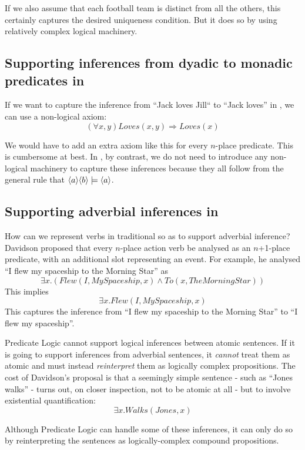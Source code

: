 \NI If we also assume that each football team is distinct from all the
others, this certainly captures the desired uniqueness condition.  But
it does so by using relatively complex logical machinery.

\subsection{Supporting inferences from dyadic to monadic predicates in \fol}
If we want to capture the inference from ``Jack loves Jill`` to ``Jack
loves'' in \fol{}, we can use a non-logical axiom:
\[
(\forall x, y) Loves(x,y) \Rightarrow Loves(x)
\]

\NI We would have to add an extra  axiom like this for every
$n$-place predicate.  This is cumbersome at best.  In \cathoristic{}, by
contrast, we do not need to introduce any non-logical machinery 
to capture these inferences because they all follow from the general
rule that $\MAY{a} \MAY{b} \models \MAY{a}$.

\subsection{Supporting adverbial inferences in \fol{}}

\NI How can we represent verbs in traditional \fol{} so as to
support adverbial inference?  Davidson \cite{davidson2} proposed that
every $n$-place action verb be analysed as an $n$+1-place predicate,
with an additional slot representing an event.  For example, he
analysed ``I flew my spaceship to the Morning Star'' as
\[
\exists x. ( Flew(I, MySpaceship, x) \land To(x, TheMorningStar))
\]
This implies 
\[
\exists x.  Flew(I, MySpaceship, x)
\]
This captures the inference from ``I flew my spaceship to the Morning Star'' to ``I flew my spaceship''.

Predicate Logic cannot support logical inferences between atomic sentences. 
If it is going to support inferences from adverbial sentences, it \emph{cannot} treat them as atomic and must instead \emph{reinterpret} them as logically complex propositions.
The cost of Davidson's proposal is that a seemingly simple sentence - such as ``Jones walks'' - turns out, on closer inspection, not to be atomic at all -  but to involve existential quantification:
\[
\exists x.  Walks(Jones, x)
\]

\NI Although Predicate Logic can handle some of these inferences, it
can only do so by reinterpreting the sentences as logically-complex
compound propositions.

